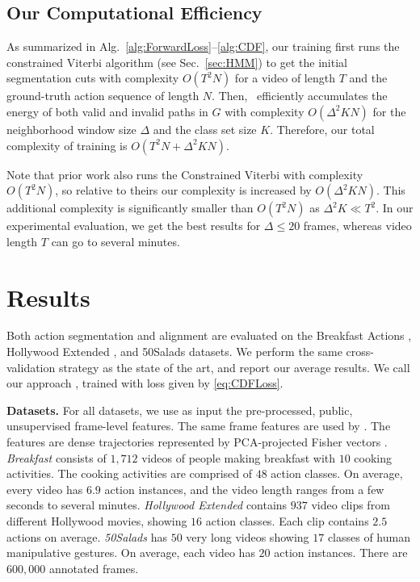 \documentclass[10pt,twocolumn,letterpaper]{article}
\begin{document}
\subsection{Our Computational Efficiency}\label{sec:Effectiveness}

As summarized in Alg.~\ref{alg:ForwardLoss}--\ref{alg:CDF}, our training first runs the constrained Viterbi algorithm (see Sec.~\ref{sec:HMM}) to get the initial segmentation cuts with complexity  $O(T^2N)$ for a video of length $T$ and the ground-truth action sequence of length $N$. Then, \abbrmodel\ efficiently accumulates the energy of both valid and invalid paths in $G$ with complexity $O(\Delta^2KN)$ for the neighborhood window size $\Delta$ and the class set size $K$. Therefore, our total complexity of training is $O(T^2N + \Delta^2KN)$. 

Note that prior work \cite{richard2018neuralnetwork} also runs the Constrained Viterbi with complexity $O(T^2N)$, so relative to theirs our complexity is increased by $O(\Delta^2 KN)$. This additional complexity is significantly smaller than $O(T^2N)$ as $\Delta^2 K \ll T^2$. In our experimental evaluation, we get the best results for  $\Delta \le 20$ frames, whereas video length $T$ can go to several minutes.





\section{Results}\label{sec:Experiment}

Both action segmentation and alignment are evaluated on the Breakfast Actions \cite{kuehne2014language}, Hollywood Extended \cite{bojanowski2014weakly}, and 50Salads \cite{stein2013combining} datasets. We perform the same cross-validation strategy as the state of the art, and report our average results. 
We call our approach  \abbrmodel, trained with loss given by \eqref{eq:CDFLoss}.

{\bf Datasets.} For all datasets, we use as input the pre-processed, public, unsupervised frame-level features. The same frame features are used by \cite{huang2016connectionist, richard2017weaklysupervised, richard2017weakly, richard2018neuralnetwork}. The features are dense trajectories represented by PCA-projected Fisher vectors \cite{kuehne2016end}. {\em Breakfast} \cite{kuehne2014language} consists of $1,712$ videos of people making breakfast with $10$ cooking activities. The cooking activities are comprised of $48$ action classes. On average, every video has $6.9$ action instances, and the video length ranges from a few seconds to several minutes. {\em Hollywood Extended} \cite{bojanowski2014weakly} contains $937$ video clips from different Hollywood movies, showing $16$ action classes. Each clip contains $2.5$ actions on average. {\em 50Salads} \cite{stein2013combining} has $50$ very long videos showing $17$ classes of human manipulative gestures. On average, each video has $20$ action instances. There are $600,000$ annotated frames.
\end{document}
